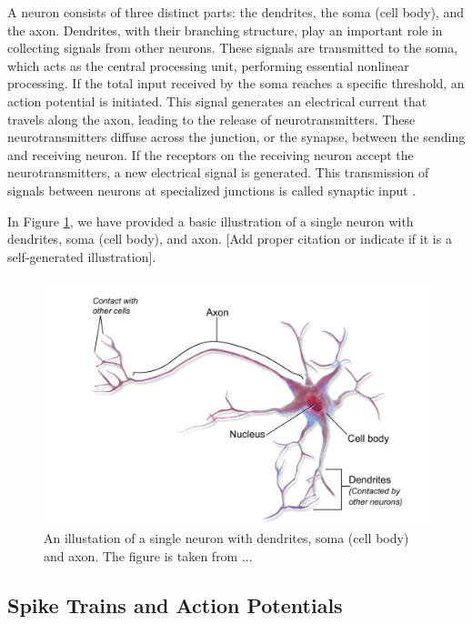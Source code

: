 \documentclass[a4paper, UKenglish, 11pt]{uiomaster}
\begin{document}
A neuron consists of three distinct parts: the dendrites, the soma (cell body), and the axon. Dendrites, with their branching structure, play an important role in collecting signals from other neurons. These signals are transmitted to the soma, which acts as the central processing unit, performing essential nonlinear processing. If the total input received by the soma reaches a specific threshold, an action potential is initiated. This signal generates an electrical current that travels along the axon, leading to the release of neurotransmitters. These neurotransmitters diffuse across the junction, or the synapse, between the sending and receiving neuron. If the receptors on the receiving neuron accept the neurotransmitters, a new electrical signal is generated. This transmission of signals between neurons at specialized junctions is called synaptic input \cite{gerstner2014neuronal}.

In Figure \ref{fig:neuron}, we have provided a basic illustration of a single neuron with dendrites, soma (cell body), and axon. [Add proper citation or indicate if it is a self-generated illustration].

\begin{figure}
    \centering
    \includegraphics[width=\linewidth]{figures/neuron.png}
    \caption{An illustation of a single neuron with dendrites, soma (cell body) and axon. The figure is taken from ...}
    \label{fig:neuron}
\end{figure}


\subsection{Spike Trains and Action Potentials}
\end{document}
